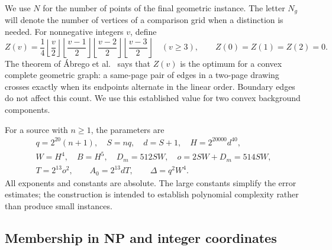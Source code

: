 We use $N$ for the number of points of the final geometric instance.
The letter $N_g$ will denote the number of vertices of a comparison grid
when a distinction is needed. For nonnegative integers $v$, define
\[
 Z(v)=\frac14\left\lfloor\frac v2\right\rfloor
                  \left\lfloor\frac{v-1}{2}\right\rfloor
                  \left\lfloor\frac{v-2}{2}\right\rfloor
                  \left\lfloor\frac{v-3}{2}\right\rfloor
 \quad(v\geq3),\qquad Z(0)=Z(1)=Z(2)=0.
\]
The theorem of \'{A}brego et al.\ \cite[Theorem~7]{Abrego2013} says that
$Z(v)$ is the optimum for a convex complete geometric graph: a same-page
pair of edges in a two-page drawing crosses exactly when its endpoints
alternate in the linear order. Boundary edges do not affect this count.
We use this established value for two convex background components.

For a source with $n\geq1$, the parameters are
\begin{equation}\label{eq:parameters}
\begin{gathered}
 q=2^{20}(n+1),\quad S=nq,\quad d=S+1,\quad H=2^{20000}d^{40},\\
 W=H^4,\quad B=H^5,\quad D_m=512SW,\quad o=2SW+D_m=514SW,\\
 T=2^{13}o^2,\qquad A_0=2^{13}dT,\qquad
 \Delta=q^2W^4.
\end{gathered}
\end{equation}
All exponents and constants are absolute. The large constants simplify
the error estimates; the construction is intended to establish polynomial
complexity rather than produce small instances.

\subsection{Membership in NP and integer coordinates}

